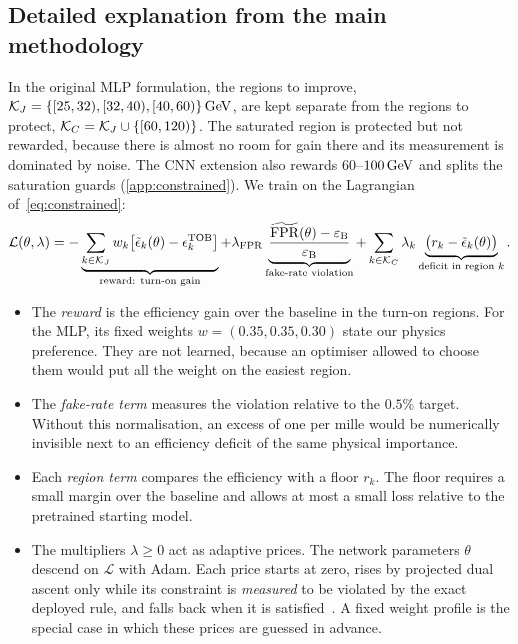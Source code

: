 \subsection{Detailed explanation from the main methodology}
In the original MLP formulation, the regions to improve, $\mathcal{K}_J=\{[25,32),[32,40),[40,60)\}\,\mathrm{GeV}$, are kept separate from the regions to protect, $\mathcal{K}_C=\mathcal{K}_J\cup\{[60,120)\}$. The saturated region is protected but not rewarded, because there is almost no room for gain there and its measurement is dominated by noise. The CNN extension also rewards $60$--$100\,\mathrm{GeV}$ and splits the saturation guards (\cref{app:constrained}). We train on the Lagrangian of~\eqref{eq:constrained}:
\begin{equation}
  \mathcal{L}(\theta,\lambda)=
  -\underbrace{\sum_{k\in\mathcal{K}_J}w_k\big[\tilde{\epsilon}_k(\theta)-\epsilon^{\mathrm{TOB}}_k\big]}_{\text{reward: turn-on gain}}
  +\lambda_{\mathrm{FPR}}\underbrace{\frac{\widetilde{\mathrm{FPR}}(\theta)-\varepsilon_{\mathrm{B}}}{\varepsilon_{\mathrm{B}}}}_{\text{fake-rate violation}}
  +\sum_{k\in\mathcal{K}_C}\lambda_k\underbrace{\big(r_k-\tilde{\epsilon}_k(\theta)\big)}_{\text{deficit in region }k}.
  \label{eq:lagrangian}
\end{equation}
\begin{itemize}
  \item The \emph{reward} is the efficiency gain over the baseline in the turn-on regions. For the MLP, its fixed weights $w=(0.35,0.35,0.30)$ state our physics preference. They are not learned, because an optimiser allowed to choose them would put all the weight on the easiest region.
  \item The \emph{fake-rate term} measures the violation relative to the $0.5\%$ target. Without this normalisation, an excess of one per mille would be numerically invisible next to an efficiency deficit of the same physical importance.
  \item Each \emph{region term} compares the efficiency with a floor $r_k$. The floor requires a small margin over the baseline and allows at most a small loss relative to the pretrained starting model.
  \item The multipliers $\lambda\geq0$ act as adaptive prices. The network parameters $\theta$ descend on $\mathcal{L}$ with Adam. Each price starts at zero, rises by projected dual ascent only while its constraint is \emph{measured} to be violated by the exact deployed rule, and falls back when it is satisfied~\cite{cotter2019proxy}. A fixed weight profile is the special case in which these prices are guessed in advance.
\end{itemize}
